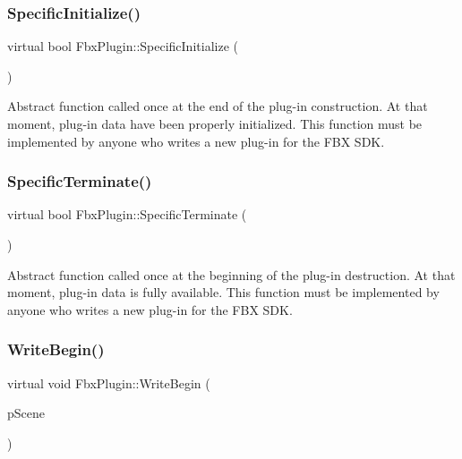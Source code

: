 \subsubsection{\texorpdfstring{Specific\+Initialize()}{SpecificInitialize()}}
{\footnotesize\ttfamily virtual bool Fbx\+Plugin\+::\+Specific\+Initialize (\begin{DoxyParamCaption}{ }\end{DoxyParamCaption})\hspace{0.3cm}{\ttfamily [pure virtual]}}

Abstract function called once at the end of the plug-\/in construction. At that moment, plug-\/in data have been properly initialized. This function must be implemented by anyone who writes a new plug-\/in for the F\+BX S\+DK. \mbox{\label{class_fbx_plugin_ade394d2752689a4690a29b34d347446e}} 
\subsubsection{\texorpdfstring{Specific\+Terminate()}{SpecificTerminate()}}
{\footnotesize\ttfamily virtual bool Fbx\+Plugin\+::\+Specific\+Terminate (\begin{DoxyParamCaption}{ }\end{DoxyParamCaption})\hspace{0.3cm}{\ttfamily [pure virtual]}}

Abstract function called once at the beginning of the plug-\/in destruction. At that moment, plug-\/in data is fully available. This function must be implemented by anyone who writes a new plug-\/in for the F\+BX S\+DK. \mbox{\label{class_fbx_plugin_aff87a8ef5c8b6bae66cc10970b7827bf}} 
\subsubsection{\texorpdfstring{Write\+Begin()}{WriteBegin()}}
{\footnotesize\ttfamily virtual void Fbx\+Plugin\+::\+Write\+Begin (\begin{DoxyParamCaption}\item[{\hyperlink{class_fbx_scene}{Fbx\+Scene} \&}]{p\+Scene }\end{DoxyParamCaption})\hspace{0.3cm}{\ttfamily [virtual]}}

